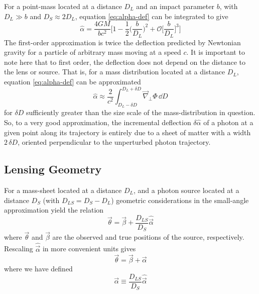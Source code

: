 For a point-mass located at a distance $D_L$ and an impact parameter $b$, with $D_L \gg b$ and $D_S \approx 2D_L$, equation \ref{eq:alpha-def} can be integrated to give
\begin{equation}
  \hat{\alpha} = \frac{4GM}{bc^2}\Bigg[1 - \frac{1}{2}\bigg(\frac{b}{D_L}\bigg)^2 + \mathcal{O}\bigg[\frac{b}{D_L}\bigg]^3 \Bigg]
\end{equation}
The first-order approximation is twice the deflection predicted by Newtonian gravity for a particle of arbitrary mass moving at a speed $c$.  It is important to note here that to first order, the deflection does not depend on the distance to the lens or source.  That is, for a mass distribution located at a distance $D_L$, equation \ref{eq:alpha-def} can be approximated
\begin{equation}
  \label{eq:alpha-def-approx}
  \hat{\alpha} \approx \frac{2}{c^2}\int_{D_L-\delta D}^{D_L+\delta D} \vec{\nabla}_\perp\Phi\,\dd D
\end{equation}
for $\delta D$ sufficiently greater than the size scale of the mass-distribution in question.
So, to a very good approximation, the incremental deflection $\delta \hat{\alpha}$ of a photon at a given point along its trajectory is entirely due to a sheet of matter with a width $2\,\delta D$, oriented perpendicular to the unperturbed photon trajectory.  

\subsection{Lensing Geometry}

For a mass-sheet located at a distance $D_L$, and a photon source located at a distance $D_S$ (with $D_{LS} = D_S - D_L$) geometric considerations in the small-angle approximation yield the relation
\begin{equation}
  \vec{\theta} = \vec{\beta} + \frac{D_{LS}}{D_S}\hat{\vec{\alpha}}
\end{equation}
where $\vec{\theta}$ and $\vec{\beta}$ are the observed and true positions of the source, respectively.  Rescaling $\hat{\vec{\alpha}}$ in more convenient units gives
\begin{equation}
  \label{eq:mapping}
  \vec{\theta} = \vec{\beta} + \vec{\alpha}
\end{equation}
where we have defined
\begin{equation}
  \label{eq:alpha-def2}
  \vec{\alpha} \equiv \frac{D_{LS}}{D_S}\hat{\vec{\alpha}}
\end{equation}

